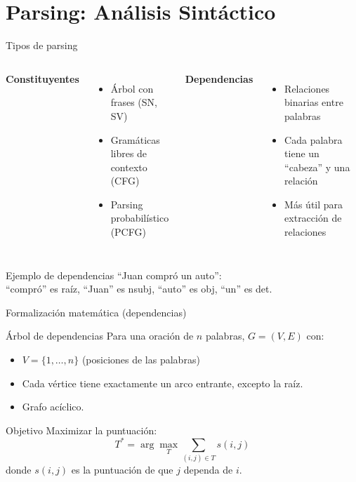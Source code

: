 \documentclass[aspectratio=169, 10pt, xcolor=table]{beamer}
\begin{document}
\section{Parsing: Análisis Sintáctico}

\begin{frame}{Tipos de parsing}
    \begin{columns}[t]
        \textbf{Constituyentes}
        \begin{itemize}
            \item Árbol con frases (SN, SV)
            \item Gramáticas libres de contexto (CFG)
            \item Parsing probabilístico (PCFG)
        \end{itemize}
        \textbf{Dependencias}
        \begin{itemize}
            \item Relaciones binarias entre palabras
            \item Cada palabra tiene un ``cabeza'' y una relación
            \item Más útil para extracción de relaciones
        \end{itemize}
    \end{columns}
    \vspace{0.3cm}
    \begin{exampleblock}{Ejemplo de dependencias}
        ``Juan compró un auto'': \\
        \hspace*{1cm} ``compró'' es raíz, ``Juan'' es nsubj, ``auto'' es obj, ``un'' es det.
    \end{exampleblock}
\end{frame}

\begin{frame}{Formalización matemática (dependencias)}
    \begin{block}{Árbol de dependencias}
        Para una oración de $n$ palabras, $G=(V,E)$ con:
        \begin{itemize}
            \item $V = \{1,\dots,n\}$ (posiciones de las palabras)
            \item Cada vértice tiene exactamente un arco entrante, excepto la raíz.
            \item Grafo acíclico.
        \end{itemize}
    \end{block}
    \begin{block}{Objetivo}
        Maximizar la puntuación:
        \[
        T^* = \arg\max_T \sum_{(i,j)\in T} s(i,j)
        \]
        donde $s(i,j)$ es la puntuación de que $j$ dependa de $i$.
    \end{block}
\end{frame}
\end{document}
